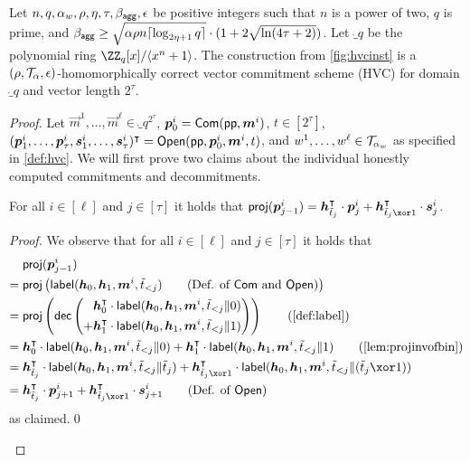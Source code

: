 \begin{lemma}\label{lem:veccomcorrectness}
  Let $n,q,\alpha_w,\rho,\eta,\tau,\beta_{\mathsf{agg}},\epsilon$ be positive integers such that $n$ is a power of two, $q$ is prime, and $\beta_{\mathsf{agg}} \geq \sqrt{\alpha\rho  n\lceil\log_{2\eta+1} q\rceil}\cdot(1+2\sqrt{\ln(4\tau+2)})$.
  Let $\ring_q$ be the polynomial ring $\ZZ_q[x]/\langle x^n+1\rangle$.
  The construction from \autoref{fig:hvcinst} is a $(\rho,\mathcal{T}_\alpha,\epsilon)$-homomorphically correct vector commitment scheme (HVC) for domain $\ring_q$ and vector length $2^\tau$.
\end{lemma}
\begin{proof}
Let $\vec{m}^1,\dots,\vec{m}^{\ell}\in\ring_q^{2^\tau}$, $\boldsymbol{p}_0^i = \mathsf{Com}(\mathsf{pp},\boldsymbol{m}^i)$, $t\in[2^\tau]$, $(\boldsymbol{p}^i_1,\dots,\boldsymbol{p}^i_{\tau},\boldsymbol{s}^i_1, \dots, \boldsymbol{s}^i_{\tau})^\intercal = \mathsf{Open}(\mathsf{pp},\boldsymbol{p}_0^i,\boldsymbol{m}^i,t)$, and $w^1,\dots,w^{\ell}\in\mathcal{T}_{\alpha_w}$
as specified in \autoref{def:hvc}.
We will first prove two claims about the individual honestly computed commitments and decommitments.

\begin{claim}\label{claim:honestcheck}
  For all $i\in[\ell]$ and $j\in[\tau]$ it holds that $\proj(\vec{p}^i_{j-1}) = \vec{h}_{\tilde t_j}^\intercal\cdot \vec{p}^i_{j} + \vec{h}_{\tilde t_j\xor 1}^\intercal \cdot \vec{s}^i_{j}$.
\end{claim}
\begin{proof}
We observe that for all $i\in[\ell]$ and $j\in[\tau]$ it holds that
\begin{align*}
  &\proj(\vec{p}^i_{j-1})\\
  ={}&\proj\left(\lbl(\vec{h}_0,\vec{h}_1,\vec{m}^i,\tilde t_{< j})\tag{Def. of $\commit$ and $\open$}\right)\\
  ={}&\proj\left(\decomp\left(\begin{aligned}
  &\vec{h}_0^\intercal \cdot\lbl(\vec{h}_0,\vec{h}_1,\vec{m}^i,\tilde t_{< j}\Vert 0)\\ +& \vec{h}_1^\intercal \cdot\lbl(\vec{h}_0,\vec{h}_1,\vec{m}^i,\tilde t_{< j}\Vert 1)
  \end{aligned}\right)\right)\tag{\autoref{def:label}}\\
  ={}&\vec{h}_0^\intercal \cdot\lbl(\vec{h}_0,\vec{h}_1,\vec{m}^i,\tilde t_{< j}\Vert 0) + \vec{h}_1^\intercal \cdot\lbl(\vec{h}_0,\vec{h}_1,\vec{m}^i,\tilde t_{< j}\Vert 1)\tag{\autoref{lem:projinvofbin}}\\
  ={}&\vec{h}_{\tilde t_{j}}^\intercal \cdot\lbl(\vec{h}_0,\vec{h}_1,\vec{m}^i,\tilde t_{< j}\Vert \tilde t_{j}) + \vec{h}_{\tilde t_{j}\xor 1}^\intercal \cdot\lbl(\vec{h}_0,\vec{h}_1,\vec{m}^i,\tilde t_{< j}\Vert (\tilde t_{j}\xor 1))\\
  ={}&\vec{h}_{\tilde t_{j}}^\intercal \cdot\vec{p}^i_{j+1} + \vec{h}_{\tilde t_{j}\xor 1}^\intercal \cdot\vec{s}^i_{j+1}\tag{Def. of $\open$}
\end{align*} as claimed.\qed
\end{proof}




\end{proof}
